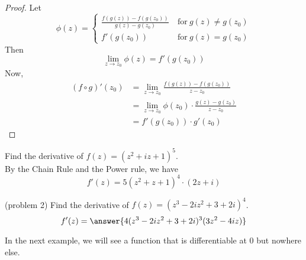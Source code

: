 \documentclass[handout]{ximera}
\begin{document}
\begin{proof}

Let
\[ \phi(z)  = \left\{
     \begin{array}{lr}
       \frac{f(g(z)) - f(g(z_0))}{g(z) -g(z_0)} & \ \text{for} \  g(z) \neq g(z_0) \\[12pt]
       f'(g(z_0)) & \ \text{for} \ g(z) = g(z_0)
     \end{array}
   \right.
\]
Then
\[
\lim_{z \to z_0} \phi(z) = f'(g(z_0))
\]
Now, 
\begin{align*}
(f\circ g)'(z_0) &= \lim_{z\to z_0} \frac{f(g(z)) - f(g(z_0))}{z-z_0} \\[10pt]
                 &= \lim_{z \to z_0} \phi(z_0) \cdot \frac{g(z) - g(z_0)}{z-z_0} \\[10pt]
                 &= f'(g(z_0)) \cdot g'(z_0)
\end{align*}

\end{proof}

\begin{example}[example 2]
Find the derivative of $f(z) = (z^2 + iz + 1)^5$.\\
By the Chain Rule and the Power rule, we have
\[
f'(z) = 5(z^2 + z + 1)^4 \cdot (2z +i)
\]
\end{example}

\begin{problem}(problem 2)
Find the derivative of $f(z) = (z^3 - 2iz^2 + 3 + 2i)^4$.\\
\[
f'(z) = \answer{4(z^3 - 2iz^2 + 3 + 2i)^3 (3z^2 -4iz)}
\]

\end{problem}
In the next example, we will see a function that is differentiable at $0$ but nowhere else.
\end{document}
